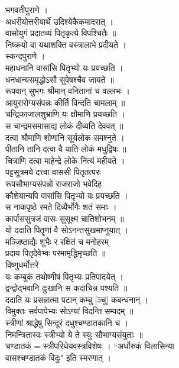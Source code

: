 \documentclass[11pt, openany]{book}
\begin{document}
{{{{{{{{{{{{{{{{{{{{{{{{{{{{{{{{{{{{{{{{{{{{{{{{{{{{{{{{{{{{{{{{{{{{{{{{{{{{{{{{{{{{{{{{{{{{{{{{{{{{{{{{{{{भगवतीपुराणे ।\\
अधरीयोत्तरीयार्थे उदिश्येकैकमादरात् ।\\
वासोयुगं प्रदातव्यं पितृकृत्ये विपश्चितैः ॥\\
निष्क्रयो वा यथाशक्ति वस्त्रालाभे प्रदीयते ।\\
स्कन्दपुराणे ।\\
महाधनानि वासांसि पितृभ्यो यः प्रयच्छति ।\\
धनधान्यसमृद्धोऽसौ सुवेषश्चैव जायते ॥\\
रूपवान् सुभगः श्रीमान् वनितानां च वल्लभः ।\\
आयुरारोग्यसंपन्नः कीर्ति विन्दति चामलाम् ॥\\
चन्द्रिकाजालशुभ्राणि यः क्षौमाणि प्रयच्छति ।\\
स चान्द्रमसमासाद्य लोकं दीव्यति देववत् ॥\\
दत्वा श्रौमाणि शोणानि सूर्यलोक समश्नुते ।\\
पीतानि तानि दत्वा वै याति लोकं मधुद्विषः ॥\\
चित्राणि दत्वा माहेन्द्रे लोके नित्यं महीयते ।\\
पट्टसूत्रमये दत्त्वा वाससी पितृतत्परः \textbar{}\\
रूपसौभाग्यसंपन्नो राजराजो भवेदिह \textbar{}\textbar{}\\
कौशेयान्यपि वासांसि पितृभ्यो यः प्रयच्छति ।\\
स नाकपृष्ठे रमते दिव्यैर्भोगैः शतं समाः ।\\
कार्पाससुत्रजं वासः सुसूक्ष्म चातिशोभनम् ॥\\
यो ददाति पितॄणां वै सोऽनन्तसुखमाप्नुयात् ।\\
मञ्जिष्ठाद्यैः शुभैः र रक्षितं च मनोहरम् \textbar{}\textbar{}\\
प्रदाय पितृदेवेभ्वः परमामृद्धिमृच्छति ॥\\
विष्णुधर्मोत्तरे \textbar{}\\
यः कम्बुकं तथोष्णीषं पितृभ्यः प्रतिपादयेत् ।\\
द्वन्द्वोद्भवानि दुःखानि स कदाचिन्न पश्यति ॥\\
ददाति यः प्रसन्नात्मा पटान् कम्बु {[}ञ्चु{]} कबन्धनान् ।\\
विमुक्तः सर्वपापेभ्यः सोऽग्यां विदन्ति सम्पदम् ॥\\
स्त्रीणां श्राद्धेषु सिन्दूरं दधुश्चण्डातकानि च ।\\
निमन्त्रितास्वः स्त्रीभ्यो ये ते स्युः सौभाग्यसंयुताः ॥\\
चण्डातकं = स्त्रीपरिधेयवस्त्रविशेषः । ``अर्धोरुकं विलासिन्या\\
वासश्चण्डातकं विदुः" इति स्मरणात् ।\\


}}}}}}}}}}}}}}}}}}}}}}}}}}}}}}}}}}}}}}}}}}}}}}}}}}}}}}}}}}}}}}}}}}}}}}}}}}}}}}}}}}}}}}}}}}}}}}}}}}}}}}}}}}}
\end{document}
